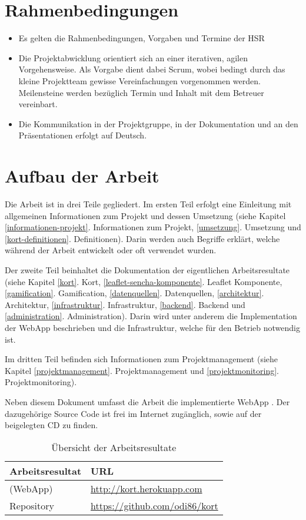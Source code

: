 \section{Rahmenbedingungen}
\begin{itemize}
\item Es gelten die Rahmenbedingungen, Vorgaben und Termine der HSR
\item Die Projektabwicklung orientiert sich an einer iterativen, agilen Vorgehensweise. Als Vorgabe dient dabei Scrum, wobei bedingt durch das kleine Projektteam gewisse Vereinfachungen vorgenommen werden. Meilensteine werden bezüglich Termin und Inhalt mit dem Betreuer vereinbart.
\item Die Kommunikation in der Projektgruppe, in der Dokumentation und an den Präsentationen erfolgt auf Deutsch.
\end{itemize}

\section{Aufbau der Arbeit}
Die Arbeit ist in drei Teile gegliedert. Im ersten Teil erfolgt eine Einleitung mit allgemeinen Informationen zum Projekt und dessen Umsetzung (siehe Kapitel \ref{informationen-projekt}. Informationen zum Projekt, \ref{umsetzung}. Umsetzung und \ref{kort-definitionen}. Definitionen). Darin werden auch Begriffe erklärt, welche während der Arbeit entwickelt oder oft verwendet wurden.

Der zweite Teil beinhaltet die Dokumentation der eigentlichen Arbeitsresultate (siehe Kapitel \ref{kort}. Kort, \ref{leaflet-sencha-komponente}. Leaflet Komponente, \ref{gamification}. Gamification, \ref{datenquellen}. Datenquellen, \ref{architektur}. Architektur, \ref{infrastruktur}. Infrastruktur, \ref{backend}. Backend und \ref{administration}. Administration). Darin wird unter anderem die Implementation der \gls{WebApp} beschrieben und die Infrastruktur, welche für den Betrieb notwendig ist.

Im dritten Teil befinden sich Informationen zum Projektmanagement (siehe Kapitel \ref{projektmanagement}. Projektmanagement und \ref{projektmonitoring}. Projektmonitoring).

Neben diesem Dokument umfasst die Arbeit die implementierte \gls{WebApp} \kort{}. Der dazugehörige Source Code ist frei im Internet zugänglich, sowie auf der beigelegten CD zu finden.

\begin{table}[H]
\centering
\begin{tabular}{|p{0.3\twocelltabwidth}|p{0.7\twocelltabwidth}|}
\hline 
\textbf{Arbeitsresultat} & \textbf{URL} \\ 
\hline 
\kort{} (\gls{WebApp}) & \url{http://kort.herokuapp.com} \\ 
\hline 
Repository & \url{https://github.com/odi86/kort} \\ 
\hline 
\end{tabular}
\label{arbeitsresultate}
\caption{Übersicht der Arbeitsresultate}
\end{table} 